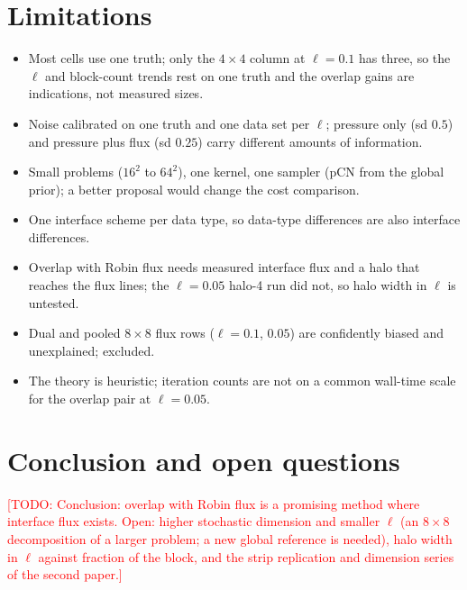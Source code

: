 \documentclass[11pt]{article}
\newcommand{\todo}[1]{\textcolor{red}{[TODO: #1]}}
\begin{document}
\section{Limitations}\label{sec:limits}
\begin{itemize}
\item Most cells use one truth; only the $4\times4$ column at $\ell=0.1$ has three, so the $\ell$ and block-count trends rest on one truth and the overlap gains are indications, not measured sizes.
\item Noise calibrated on one truth and one data set per $\ell$; pressure only (sd $0.5$) and pressure plus flux (sd $0.25$) carry different amounts of information.
\item Small problems ($16^2$ to $64^2$), one kernel, one sampler (pCN from the global prior); a better proposal would change the cost comparison.
\item One interface scheme per data type, so data-type differences are also interface differences.
\item Overlap with Robin flux needs measured interface flux and a halo that reaches the flux lines; the $\ell=0.05$ halo-4 run did not, so halo width in $\ell$ is untested.
\item Dual and pooled $8\times8$ flux rows ($\ell=0.1$, $0.05$) are confidently biased and unexplained; excluded.
\item The theory is heuristic; iteration counts are not on a common wall-time scale for the overlap pair at $\ell=0.05$.
\end{itemize}

\section{Conclusion and open questions}\label{sec:conclusion}
\todo{Conclusion: overlap with Robin flux is a promising method where interface flux exists. Open: higher stochastic dimension and smaller $\ell$ (an $8\times8$ decomposition of a larger problem; a new global reference is needed), halo width in $\ell$ against fraction of the block, and the strip replication and dimension series of the second paper.}

\appendix
\end{document}
